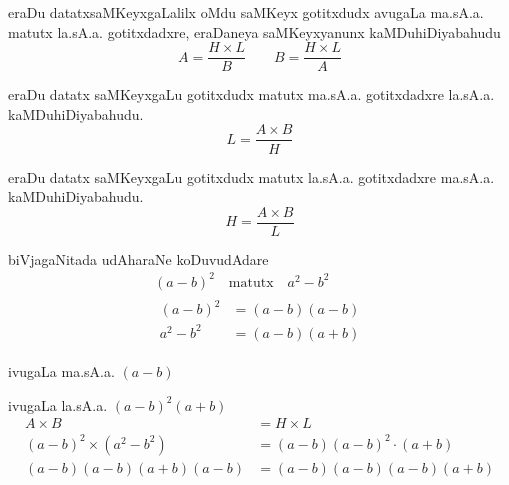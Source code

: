 eraDu datatxsaMKeyxgaLalilx oMdu saMKeyx gotitxdudx avugaLa ma.sA.a. matutx la.sA.a. gotitxdadxre, eraDaneya saMKeyxyanunx kaMDuhiDiyabahudu
$$
A= \frac{H \times L}{B} \qquad  B= \frac{H \times L}{A}
$$

eraDu datatx  saMKeyxgaLu gotitxdudx matutx ma.sA.a. gotitxdadxre la.sA.a. kaMDu\-hiDiyabahudu.
$$
L=\frac{A\times B}{H}
$$

eraDu datatx  saMKeyxgaLu gotitxdudx matutx la.sA.a. gotitxdadxre ma.sA.a. kaMDu\-hiDiyabahudu.
$$
H=\frac{A\times B}{L}
$$

biVjagaNitada udAharaNe koDuvudAdare
\begin{gather*}
(a-b)^2 \quad\text{matutx}\quad a^{2}-b^{2}\\
\begin{split}
(a-b)^2 &= (a-b)(a-b)\\
a^2-b^2 &= (a-b)(a+b)
\end{split}
\end{gather*}

ivugaLa ma.sA.a. $(a-b)$

ivugaLa la.sA.a. $(a-b)^2(a+b)$
\begin{align*}
A\times B &= H\times L\\
(a-b)^2 \times (a^2-b^2) &= (a-b)(a-b)^2\cdot(a+b)\\
(a-b)(a-b)(a+b)(a-b) &= (a-b)(a-b)(a-b)(a+b)
\end{align*}
